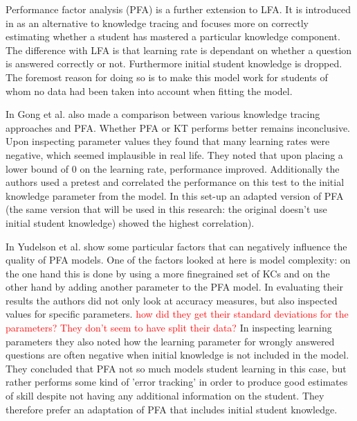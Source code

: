 \documentclass{scrartcl}
\newcommand\todo[1]{\textcolor{red}{#1}}
\begin{document}
Performance factor analysis (PFA) is a further extension to LFA. It is introduced in \cite{pfa} as an alternative to knowledge tracing and focuses more on correctly estimating whether a student has mastered a particular knowledge component. The difference with LFA is that learning rate is dependant on whether a question is answered correctly or not. Furthermore initial student knowledge is dropped. The foremost reason for doing so is to make this model work for students of whom no data had been taken into account when fitting the model.

In \cite{ktpfa} Gong et al. also made a comparison between various knowledge tracing approaches and PFA. Whether PFA or KT performs better remains inconclusive. Upon inspecting parameter values they found that many learning rates were negative, which seemed implausible in real life. They noted that upon placing a lower bound of 0 on the learning rate, performance improved.  Additionally the authors used a pretest and correlated the performance on this test to the initial knowledge parameter from the model. In this set-up an adapted version of PFA (the same version that will be used in this research: the original doesn't use initial student knowledge) showed the highest correlation).

In \cite{blackart} Yudelson et al. show some particular factors that can negatively influence the quality of PFA models. One of the factors looked at here is model complexity: on the one hand this is done by using a more finegrained set of KCs and on the other hand by adding another parameter to the PFA model. In evaluating their results the authors did not only look at accuracy measures, but also inspected values for specific parameters. \todo{how did they get their standard deviations for the parameters? They don't seem to have split their data?} In inspecting learning parameters they also noted how the learning parameter for wrongly answered questions are often negative when initial knowledge is not included in the model. They concluded that PFA not so much models student learning in this case, but rather performs some kind of 'error tracking' in order to produce good estimates of skill despite not having any additional information on the student. They therefore prefer an adaptation of PFA that includes initial student knowledge.
\end{document}
